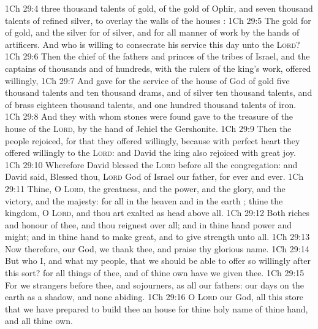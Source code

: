 \vs 1Ch 29:4  three thousand talents of gold, of the gold of Ophir, and seven thousand talents of refined silver, to overlay the walls of the houses :
\vs 1Ch 29:5 The gold for  of gold, and the silver for  of silver, and for all manner of work  by the hands of artificers. And who  is willing to consecrate his service this day unto the \textsc{Lord}?
\vs 1Ch 29:6 Then the chief of the fathers and princes of the tribes of Israel, and the captains of thousands and of hundreds, with the rulers of the king's work, offered willingly,
\vs 1Ch 29:7 And gave for the service of the house of God of gold five thousand talents and ten thousand drams, and of silver ten thousand talents, and of brass eighteen thousand talents, and one hundred thousand talents of iron.
\vs 1Ch 29:8 And they with whom  stones were found gave  to the treasure of the house of the \textsc{Lord}, by the hand of Jehiel the Gershonite.
\vs 1Ch 29:9 Then the people rejoiced, for that they offered willingly, because with perfect heart they offered willingly to the \textsc{Lord}: and David the king also rejoiced with great joy.
\vs 1Ch 29:10 Wherefore David blessed the \textsc{Lord} before all the congregation: and David said, Blessed  thou, \textsc{Lord} God of Israel our father, for ever and ever.
\vs 1Ch 29:11 Thine, O \textsc{Lord},  the greatness, and the power, and the glory, and the victory, and the majesty: for all  in the heaven and in the earth ; thine  the kingdom, O \textsc{Lord}, and thou art exalted as head above all.
\vs 1Ch 29:12 Both riches and honour  of thee, and thou reignest over all; and in thine hand  power and might; and in thine hand  to make great, and to give strength unto all.
\vs 1Ch 29:13 Now therefore, our God, we thank thee, and praise thy glorious name.
\vs 1Ch 29:14 But who  I, and what  my people, that we should be able to offer so willingly after this sort? for all things  of thee, and of thine own have we given thee.
\vs 1Ch 29:15 For we  strangers before thee, and sojourners, as  all our fathers: our days on the earth  as a shadow, and  none abiding.
\vs 1Ch 29:16 O \textsc{Lord} our God, all this store that we have prepared to build thee an house for thine holy name  of thine hand, and  all thine own.
